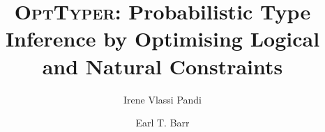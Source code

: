 \documentclass[acmsmall,nonacm]{acmart}\settopmatter{printfolios=true,printccs=false,printacmref=false}
\begin{document}
\title{\textsc{OptTyper}: Probabilistic Type Inference by Optimising Logical and Natural Constraints}



\author{Irene Vlassi Pandi}

\author{Earl T. Barr}
\end{document}
